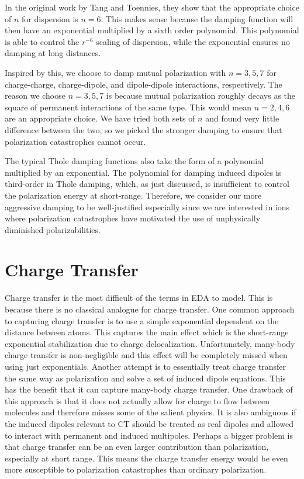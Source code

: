 \documentclass[journal=jacsat,manuscript=article]{achemso}
\begin{document}
In the original work by Tang and Toennies, they show that the appropriate choice
of $n$ for dispersion is $n=6$. This makes sense because the damping function will
then have an exponential multiplied by a sixth order polynomial. This polynomial is
able to control the $r^{-6}$ scaling of dispersion, while the exponential ensures no
damping at long distances.

Inspired by this, we choose to damp mutual polarization with $n=3,5,7$ for
charge-charge, charge-dipole, and dipole-dipole interactions, respectively.
The reason we choose $n=3,5,7$ is because mutual polarization
roughly decays as the square of permanent interactions of the same type. This
would mean $n=2,4,6$ are an appropriate choice. We have tried both
sets of $n$ and found very little difference between the two, so we picked the stronger damping
to ensure that polarization catastrophes cannot occur.

The typical Thole damping functions also take the form of a polynomial
multiplied by an exponential. The polynomial for damping induced dipoles is third-order in Thole damping,
which, as just discussed, is insufficient to control the polarization
energy at short-range. Therefore, we consider our more aggressive damping to be well-justified
especially since we are interested in ions where polarization catastrophes have
motivated the use of unphysically diminished polarizabilities.\cite{ponder2010current}

\section*{Charge Transfer}
Charge transfer is the most difficult of the terms in EDA to model. This is
because there is no classical analogue for charge transfer. One common approach to
capturing charge transfer is to use a simple exponential dependent on the distance
between atoms.\cite{rackers2021polarizable} This captures the main effect which is the
short-range exponential stabilization due to charge delocalization. Unfortunately,
many-body charge transfer is non-negligible and this effect will be completely
missed when using just exponentials. Another attempt is to essentially treat
charge transfer the same way as polarization and solve a set of induced dipole equations.\cite{das2019development,wang2023general}
This has the benefit that it can capture many-body charge transfer. One drawback of this
approach is that it does not actually allow for charge to flow between molecules
and therefore misses some of the salient physics. It is also ambiguous if the induced
dipoles relevant to CT should be treated as real dipoles and allowed to interact 
with permanent and induced multipoles. Perhaps a bigger problem is that
charge transfer can be an even larger contribution than polarization, especially at short range.
This means the charge transfer energy would be even more susceptible to
polarization catastrophes than ordinary polarization.
\end{document}
